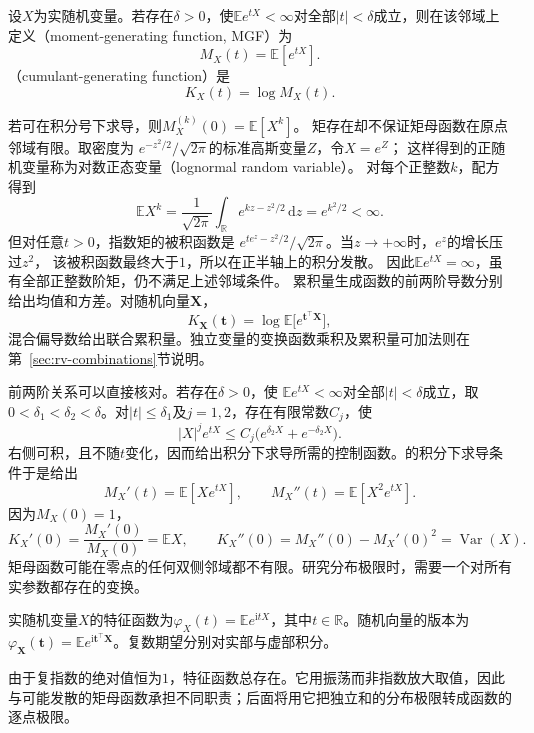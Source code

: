 \begin{definition}[矩母函数与累积量生成函数]
  \label{def:probability-moment-generating-functions}
设\(X\)为实随机变量。若存在\(\delta>0\)，使\(\mathbb E e^{tX}<\infty\)对全部\(|t|<\delta\)成立，则在该邻域上定义（moment-generating function, MGF）为
\[ M_X(t)=\mathbb{E}[e^{tX}]. \]
（cumulant-generating function）是
\[ K_X(t)=\log M_X(t). \]
\end{definition}
若可在积分号下求导，则\(M_X^{(k)}(0)=\mathbb{E}[X^k]\)。
矩存在却不保证矩母函数在原点邻域有限。取密度为
\(e^{-z^2/2}/\sqrt{2\pi}\)的标准高斯变量\(Z\)，令\(X=e^Z\)；
这样得到的正随机变量称为对数正态变量（lognormal random variable）。
对每个正整数\(k\)，配方得到
\[
 \mathbb E X^k
 =\frac1{\sqrt{2\pi}}\int_{\mathbb R}e^{kz-z^2/2}\,\mathrm dz
 =e^{k^2/2}<\infty.
\]
但对任意\(t>0\)，指数矩的被积函数是
\(e^{te^z-z^2/2}/\sqrt{2\pi}\)。当\(z\to+\infty\)时，\(e^z\)的增长压过\(z^2\)，
该被积函数最终大于\(1\)，所以在正半轴上的积分发散。
因此\(\mathbb E e^{tX}=\infty\)，虽有全部正整数阶矩，仍不满足上述邻域条件。
累积量生成函数的前两阶导数分别给出均值和方差。对随机向量\(\bm{X}\)，
\[ K_{\bm{X}}(\bm{t})
  =\log\mathbb{E}\bigl[e^{\bm{t}^{\top}\bm{X}}\bigr], \]
混合偏导数给出联合累积量。独立变量的变换函数乘积及累积量可加法则在第~\ref{sec:rv-combinations}节说明。

前两阶关系可以直接核对。若存在\(\delta>0\)，使
\(\mathbb E e^{tX}<\infty\)对全部\(|t|<\delta\)成立，取\(0<\delta_1<\delta_2<\delta\)。对\(|t|\leq\delta_1\)及\(j=1,2\)，存在有限常数\(C_j\)，使
\[ |X|^j e^{tX}\leq C_j\bigl(e^{\delta_2X}+e^{-\delta_2X}\bigr). \]
右侧可积，且不随\(t\)变化，因而给出积分下求导所需的控制函数。的积分下求导条件于是给出
\[
  M_X'(t)=\mathbb{E}[Xe^{tX}],\qquad
  M_X''(t)=\mathbb{E}[X^2e^{tX}].
\]
因为\(M_X(0)=1\)，
\[
  K_X'(0)=\frac{M_X'(0)}{M_X(0)}=\mathbb{E}X,
  \qquad
  K_X''(0)
  =M_X''(0)-M_X'(0)^2
  =\operatorname{Var}(X).
\]
矩母函数可能在零点的任何双侧邻域都不有限。研究分布极限时，需要一个对所有实参数都存在的变换。
\begin{definition}[特征函数]
  \label{def:probability-characteristic-function}
实随机变量\(X\)的特征函数为\(\varphi_X(t)=\mathbb E e^{\mathrm i tX}\)，其中\(t\in\mathbb R\)。随机向量的版本为\(\varphi_{\bm X}(\bm t)=\mathbb E e^{\mathrm i\bm t^\top\bm X}\)。复数期望分别对实部与虚部积分。
\end{definition}
由于复指数的绝对值恒为\(1\)，特征函数总存在。它用振荡而非指数放大取值，因此与可能发散的矩母函数承担不同职责；后面将用它把独立和的分布极限转成函数的逐点极限。

